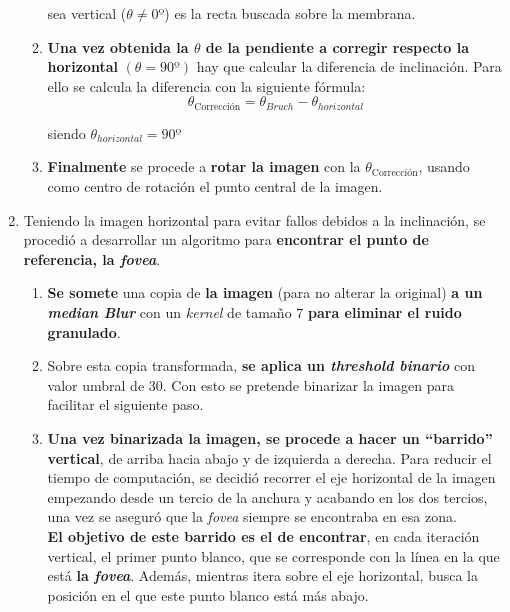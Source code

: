 \begin{enumerate}
\begin{enumerate}[label*=\arabic*.]
    sea vertical ($\theta \neq 0º$) es la recta buscada sobre la
    membrana.
  \item \textbf{Una vez obtenida la $\theta$ de la pendiente a corregir
      respecto la horizontal} $\left( \theta = 90º \right)$ hay que
    calcular la diferencia de inclinación. Para ello se calcula la
    diferencia con la siguiente fórmula:
    \begin{equation*}
      \theta_\text{Corrección} = \theta_{Bruch} - \theta_{horizontal}
    \end{equation*}
    \begin{center}
      siendo $\theta_{horizontal} = 90º$
    \end{center}
  \item \textbf{Finalmente} se procede a \textbf{rotar la imagen} con
    la $\theta_{\text{Corrección}}$, usando como centro de rotación el
    punto central de la imagen.
  \end{enumerate}
\item Teniendo la imagen horizontal para evitar fallos debidos a la
  inclinación, se procedió a desarrollar un algoritmo para
  \textbf{encontrar el punto de referencia, la \emph{\gls{fovea}}}.
  \begin{enumerate}[label*=\arabic*.]
  \item \textbf{Se somete} una copia de \textbf{la imagen} (para no
    alterar la original) \textbf{a un \emph{median
        Blur}} con un \emph{kernel} de
    tamaño $7$ \textbf{para eliminar el ruido granulado}.
  \item Sobre esta copia transformada, \textbf{se aplica un
      \emph{threshold binario}} con valor umbral de $30$. Con esto se
    pretende binarizar la imagen para facilitar el siguiente paso.
  \item \textbf{Una vez binarizada la imagen, se procede a hacer un
      ``barrido'' vertical}, de arriba hacia abajo y de izquierda a
    derecha. Para reducir el tiempo de computación, se decidió
    recorrer el eje horizontal de la imagen empezando desde un tercio
    de la anchura y acabando en los dos tercios, una vez se aseguró
    que la \emph{\gls{fovea}} siempre se encontraba en esa zona. \\
    \textbf{ El objetivo de este barrido es el de encontrar}, en cada
    iteración vertical, el primer punto blanco, que se corresponde con
    la línea en la que está \textbf{la \emph{\gls{fovea}}}. Además, mientras
    itera sobre el eje horizontal, busca la posición en el que este
    punto blanco está más abajo.

\end{enumerate}
\end{enumerate}

